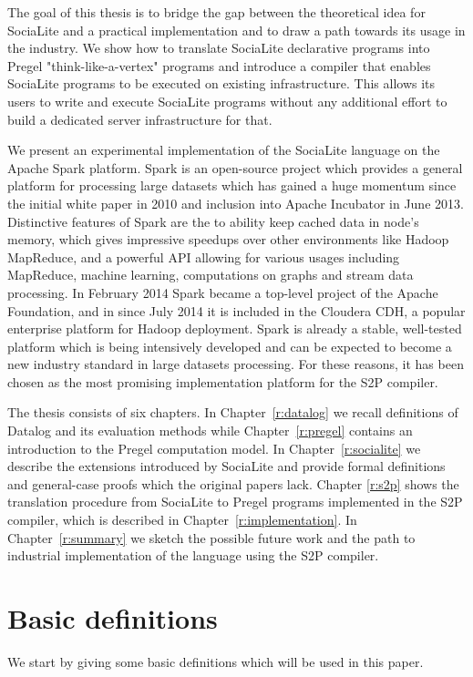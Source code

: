 The goal of this thesis is to bridge the gap between the theoretical idea for SociaLite and a practical implementation and to draw a path towards its usage in the industry. We show how to translate SociaLite declarative programs into Pregel "think-like-a-vertex" programs and introduce a compiler that enables SociaLite programs to be executed on existing infrastructure. This allows its users to write and execute SociaLite programs without any additional effort to build a dedicated server infrastructure for that.

We present an experimental implementation of the SociaLite language on the Apache Spark platform. Spark \cite{spark2} is an open-source project which provides a general platform for processing large datasets which has gained a huge momentum since the initial white paper in 2010 \cite{spark} and inclusion into Apache Incubator in June 2013. Distinctive features of Spark are the to ability keep cached data in node's memory, which gives impressive speedups over other environments like Hadoop MapReduce, and a powerful API allowing for various usages including MapReduce, machine learning, computations on graphs and stream data processing. In February 2014 Spark became a top-level project of the Apache Foundation, and in since July 2014 it is included in the Cloudera CDH, a popular enterprise platform for Hadoop deployment. Spark is already a   stable, well-tested platform which is being intensively developed and can be expected to become a new industry standard in large datasets processing. For these reasons, it has been chosen as the most promising implementation platform for the S2P compiler.

The thesis consists of six chapters. In Chapter~\ref{r:datalog} we recall definitions of Datalog and its evaluation methods while Chapter~\ref{r:pregel} contains an introduction to the Pregel computation model. In Chapter~\ref{r:socialite} we describe the extensions introduced by SociaLite and provide formal definitions and general-case proofs which the original papers lack. Chapter \ref{r:s2p} shows the translation procedure from SociaLite to Pregel programs implemented in the S2P compiler, which is described in Chapter~\ref{r:implementation}. In Chapter~\ref{r:summary} we sketch the possible future work and the path to industrial implementation of the language using the S2P compiler.

\section{Basic definitions}\label{r:basicdefs}
We start by giving some basic definitions which will be used in this paper.

